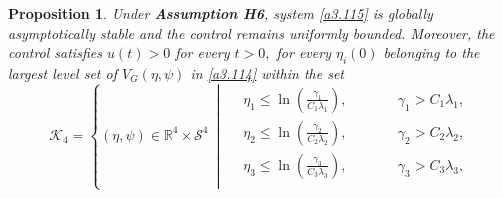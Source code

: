 \documentclass[10pt, a4paper]{amsart}
\theoremstyle{plain}
\newtheorem{proposition}[lemma]{Proposition}
\theoremstyle{definition}
\theoremstyle{remark}
\numberwithin{equation}{section}
\begin{document}
\begin{proposition}\label{proposition3.18}
Under {\bf Assumption H6},  system \eqref{a3.115} is globally asymptotically stable and the control remains uniformly bounded. Moreover, the control satisfies $u(t)>0$ for every $t>0,$ for every $\eta_i(0)$ belonging to the largest
level set of $V_G(\eta,\psi)$ in \eqref{a3.114} within the set
\begin{equation}
\mathcal{K}_4=
\left\{ (\eta,\psi)\in \mathbb{R}^4\times\mathcal{S}^4\ \middle|\ 
\begin{alignedat}{2}
&\eta_1 \le \ln\left(\frac{\gamma_1}{C_1\lambda_1}\right), \qquad && \gamma_1 > C_1\lambda_1,\\[4pt]
&\eta_2 \le \ln\left(\frac{\gamma_2}{C_2\lambda_2}\right), \qquad && \gamma_2 > C_2\lambda_2,\\[4pt]
&\eta_3 \le \ln\left(\frac{\gamma_3}{C_3\lambda_3}\right), \qquad && \gamma_3 > C_3\lambda_3,\\[4pt]

\end{alignedat}
\end{equation}
\end{proposition}
\end{document}
